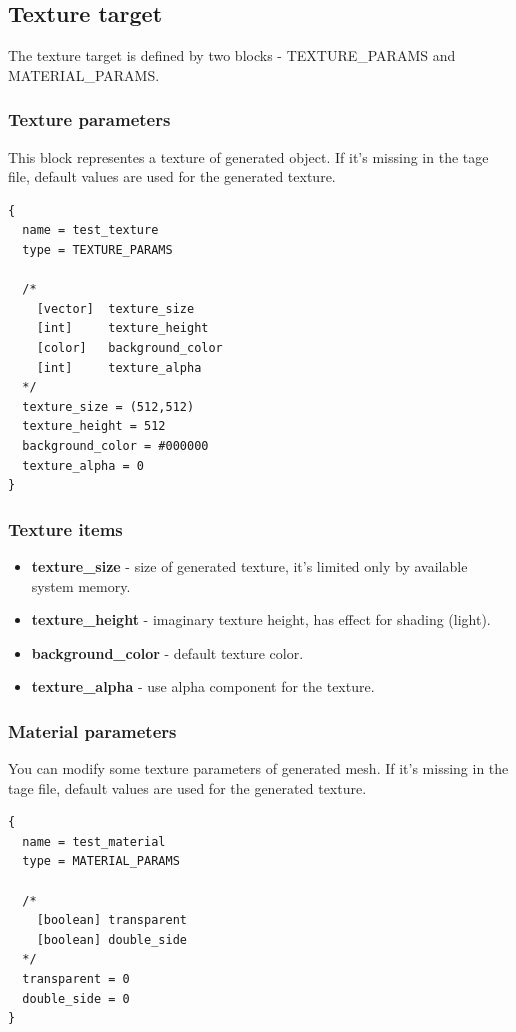 \documentclass[9pt]{article}
\begin{document}
\newpage
\subsection{Texture target}

The texture target is defined by two blocks - TEXTURE\_PARAMS and MATERIAL\_PARAMS.

\subsubsection*{Texture parameters}

This block representes a texture of generated object. If it's missing in the 
tage file, default values are used for the generated texture.

\begin{verbatim}
{
  name = test_texture
  type = TEXTURE_PARAMS

  /*
    [vector]  texture_size
    [int]     texture_height
    [color]   background_color
    [int]     texture_alpha
  */
  texture_size = (512,512)
  texture_height = 512
  background_color = #000000
  texture_alpha = 0
}
\end{verbatim}
\subsubsection*{Texture items}
\begin{itemize}
\item{\bf texture\_size} - size of generated texture, it's limited only by available system memory.
\item{\bf texture\_height} - imaginary texture height, has effect for shading (light).
\item{\bf background\_color} - default texture color.
\item{\bf texture\_alpha} - use alpha component for the texture.
\end{itemize}

\subsubsection*{Material parameters}

You can modify some texture parameters of generated mesh. If it's missing in the 
tage file, default values are used for the generated texture.

\begin{verbatim}
{
  name = test_material
  type = MATERIAL_PARAMS
  
  /*
    [boolean] transparent
    [boolean] double_side
  */
  transparent = 0
  double_side = 0  
}
\end{verbatim}
\end{document}
